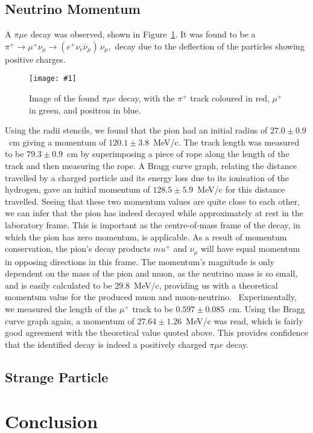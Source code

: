 \documentclass[twocolumn]{article}
\newcommand{\insertFigure}[1]{%
   \texttt{[image: \#1]}%
}
\begin{document}
\subsection{Neutrino Momentum}
A $\pi \mu e$ decay was observed, shown in Figure~\ref{fig:neutrino}. It was found to be a $\pi^+ \to \mu^+ \nu_\mu \to (e^+ \nu_e \overline{\nu}_{\mu}) \, \nu_\mu,$ decay due to the deflection of the particles showing positive charges.
\begin{figure}[!h]
	\centering
	\insertFigure{neutrino.png}
	\caption{Image of the found $\pi \mu e$ decay, with the $\pi^+$ track coloured in red, $\mu^+$ in green, and positron in blue.}
	\label{fig:neutrino}
\end{figure}
Using the radii stencils, we found that the pion had an initial radius of $27.0 \pm 0.9$~cm giving a momentum of $120.1 \pm 3.8$~MeV/c. The track length was measured to be $79.3 \pm 0.9$~cm by superimposing a piece of rope along the length of the track and then measuring the rope. A Bragg curve graph, relating the distance travelled by a charged particle and its energy loss due to its ionisation of the hydrogen, gave an initial momentum of $128.5 \pm 5.9$~MeV/c for this distance travelled. Seeing that these two momentum values are quite close to each other, we can infer that the pion has indeed decayed while approximately at rest in the laboratory frame. This is important as the centre-of-mass frame of the decay, in which the pion has zero momentum, is applicable. As a result of momentum conservation, the pion's decay products $mu^+$ and $\nu_\mu$ will have equal momentum in opposing directions in this frame. The momentum's magnitude is only dependent on the mass of the pion and muon, as the neutrino mass is so small, and is easily calculated to be $29.8$~MeV/c, providing us with a theoretical momentum value for the produced muon and muon-neutrino.~\cite{seul} Experimentally, we measured the length of the $\mu^+$ track to be $0.597 \pm 0.085$~cm. Using the Bragg curve graph again, a momentum of $27.64 \pm 1.26$~MeV/c was read, which is fairly good agreement with the theoretical value quoted above. This provides confidence that the identified decay is indeed a positively charged $\pi \mu e$ decay.

\subsection{Strange Particle}


\section{Conclusion}
\end{document}
